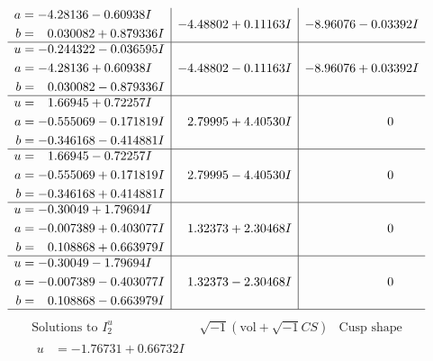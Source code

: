 \documentclass[1p]{elsarticle_modified}
\theoremstyle{definition}
\newcommand{\I}{\sqrt{-1}}
\begin{document}
$$\begin{array}{c|c|c}
\begin{aligned}
a &= -4.28136 - 0.60938 I \\
b &= \phantom{-}0.030082 + 0.879336 I\end{aligned}
 & -4.48802 + 0.11163 I & -8.96076 - 0.03392 I \\ \hline\begin{aligned}
u &= -0.244322 - 0.036595 I \\
a &= -4.28136 + 0.60938 I \\
b &= \phantom{-}0.030082 - 0.879336 I\end{aligned}
 & -4.48802 - 0.11163 I & -8.96076 + 0.03392 I \\ \hline\begin{aligned}
u &= \phantom{-}1.66945 + 0.72257 I \\
a &= -0.555069 - 0.171819 I \\
b &= -0.346168 - 0.414881 I\end{aligned}
 & \phantom{-}2.79995 + 4.40530 I & \phantom{-0.000000 } 0 \\ \hline\begin{aligned}
u &= \phantom{-}1.66945 - 0.72257 I \\
a &= -0.555069 + 0.171819 I \\
b &= -0.346168 + 0.414881 I\end{aligned}
 & \phantom{-}2.79995 - 4.40530 I & \phantom{-0.000000 } 0 \\ \hline\begin{aligned}
u &= -0.30049 + 1.79694 I \\
a &= -0.007389 + 0.403077 I \\
b &= \phantom{-}0.108868 + 0.663979 I\end{aligned}
 & \phantom{-}1.32373 + 2.30468 I & \phantom{-0.000000 } 0 \\ \hline\begin{aligned}
u &= -0.30049 - 1.79694 I \\
a &= -0.007389 - 0.403077 I \\
b &= \phantom{-}0.108868 - 0.663979 I\end{aligned}
 & \phantom{-}1.32373 - 2.30468 I & \phantom{-0.000000 } 0\\
 \hline 
 \end{array}$$\newpage$$\begin{array}{c|c|c}  
\text{Solutions to }I^u_{2}& \I (\text{vol} + \sqrt{-1}CS) & \text{Cusp shape}\\
 \hline 
\begin{aligned}
u &= -1.76731 + 0.66732 I \\

\end{aligned}
\end{array}$$
\end{document}

